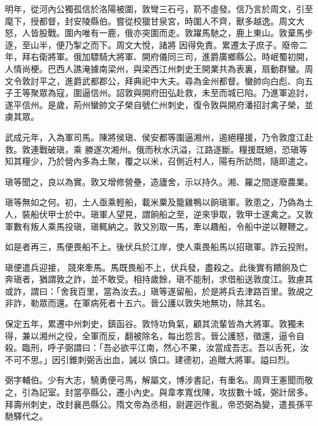 \begin{pinyinscope}
 明年，從河內公獨孤信於洛陽被圍，敦彎三石弓，箭不虛發。信乃言於周文，引至麾下，授都督，封安陵縣伯。嘗從校獵甘泉宮，時圍人不齊，獸多越逸。周文大怒，人皆股戰。圍內唯有一鹿，俄亦突圍而走。敦躍馬馳之，鹿上東山。敦棄馬步逐，至山半，便乃掣之而下。周文大悅，諸將
 因得免責。累遷太子庶子。廢帝二年，拜右衛將軍。俄加驃騎大將軍、開府儀同三司，進爵廣鄉縣公。時岷蜀初開，人情尚梗。巴西人譙淹據南梁州，與梁西江州刺史王開業共為表裏，扇動群蠻。周文令敦討平之，進爵武都郡公，拜典祀中大夫。尋為金州都督。蠻帥向白彪、向五子王等聚眾為寇，圍逼信州。詔敦與開府田弘赴救，未至而城已陷。乃進軍追討，遂平信州。是歲，荊州蠻帥文子榮自號仁州刺史，復令敦與開府潘招討禽子榮，並虜其眾。



 武成元年，入為軍司馬。陳將侯瑱、侯安都等圍逼湘州，遏絕糧援，乃令敦度江赴救。敦連戰破瑱，乘
 勝遂次湘州。俄而秋水汛溢，江路遂斷。糧援既絕，恐瑱等知其糧少，乃於營內多為土聚，覆之以米，召側近村人，陽有所訪問，隨即遣之。



 瑱等聞之，良以為實。敦又增修營壘，造廬舍，示以持久。湘、羅之間遂廢農業。



 瑱等無如之何。初，土人亟乘輕船，載米粟及籠雞鴨以餉瑱軍。敦患之，乃偽為土人，裝船伏甲士於中。瑱軍人望見，謂餉船之至，逆來爭取，敦甲士遂禽之。又敦軍數有叛人乘馬投瑱，瑱輒納之。敦又別取一馬，牽以趣船，令船中逆以鞭鞭之。



 如是者再三，馬便畏船不上。後伏兵於江岸，使人乘畏船馬以招瑱軍。詐云投附。



 瑱便遣兵迎接，
 競來牽馬。馬既畏船不上，伏兵發，盡殺之。此後實有饋餉及亡奔瑱者，猶謂敦之詐，並不敢受。相持歲餘，瑱不能制，求借船送敦度江。敦慮其或詐，謂曰：「舍我百里，當為汝去。」瑱等遂留船，於是將兵去津路百里。敦覘之非詐，勒眾而還。在軍病死者十五六。晉公護以敦失地無功，除其名。



 保定五年，累遷中州刺史，鎮函谷。敦恃功負氣，顧其流輩皆為大將軍。敦獨未得，兼以湘州之役，全軍而反，翻被除名，每出怨言。晉公護怒，徵還，逼令自殺。臨刑，呼子弼謂曰：「吾必欲平江南，然心不果，汝當成吾志。吾以舌死，汝不可不思。」因引錐刺弼舌出血，誡以
 慎口。建德初，追贈大將軍。謚曰烈。



 弼字輔伯。少有大志，驍勇便弓馬，解屬文，博涉書記，有重名。周齊王憲聞而敬之，引為記室。封當亭縣公，遷小內史。與韋孝寬伐陳，攻拔數十城，弼計居多。拜壽州刺史，改封襄邑縣公。隋文帝為丞相，尉遲迥作亂，帝恐弼為變，遣長孫平馳驛代之。




\end{pinyinscope}
